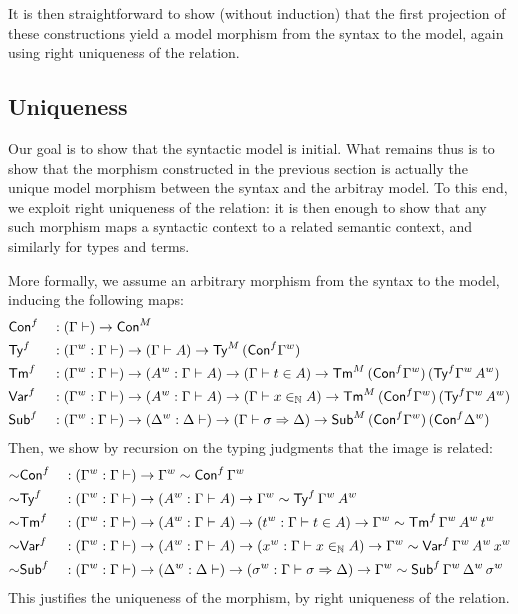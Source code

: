 It is then straightforward to show (without induction) that the first projection of these
constructions yield a model morphism from the syntax to the model, again using right
uniqueness of the relation.
\subsection{Uniqueness}
Our goal is to show that the syntactic model is initial. What remains thus is to
show that the morphism constructed in the previous section is actually the
unique model morphism between the syntax and the arbitray model.
To this end, we exploit right uniqueness of the relation: it is then enough to show
that any such morphism maps a syntactic context to a related semantic context,
and similarly for types and terms. 

More formally, we assume an arbitrary morphism from the
syntax to the model, inducing the following maps:
\begin{alignat*}{5}
  &
  {\mathsf{Con}}^f
  && :
   (\Gamma \vdash) \rightarrow {\mathsf{Con}}^M
   \\
  &
  {\mathsf{Ty}}^f
  && :
   ({\Gamma}^w:\Gamma \vdash) \rightarrow (\Gamma\vdash A)\rightarrow{\mathsf{Ty}}^M\,({\mathsf{Con}}^f{\Gamma}^w)
   \\
  &
  {\mathsf{Tm}}^f
  && :
  ({\Gamma}^w:\Gamma \vdash) \rightarrow ({A}^w:\Gamma\vdash A)\rightarrow
  (\Gamma\vdash t \in A)\rightarrow{\mathsf{Tm}}^M\,({\mathsf{Con}}^f{\Gamma}^w)\,
  ({\mathsf{Ty}}^f{\Gamma}^w\,{A}^w)
   \\
  &
  {\mathsf{Var}}^f
  && :
  ({\Gamma}^w:\Gamma \vdash) \rightarrow ({A}^w:\Gamma\vdash A)\rightarrow
  (\Gamma\vdash x \in_{\mathbb{N}} A)\rightarrow{\mathsf{Tm}}^M\,({\mathsf{Con}}^f{\Gamma}^w)\,
  ({\mathsf{Ty}}^f{\Gamma}^w\,{A}^w)
   \\
  &
  {\mathsf{Sub}}^f
  && :
  ({\Gamma}^w:\Gamma \vdash) \rightarrow
  ({\Delta}^w:\Delta \vdash) \rightarrow
  (\Gamma\vdash \sigma \Rightarrow \Delta)\rightarrow{\mathsf{Sub}}^M\,({\mathsf{Con}}^f{\Gamma}^w)\,
  ({\mathsf{Con}}^f{\Delta}^w)
\end{alignat*}
Then, we show by recursion on the typing judgments that
the image is related:
\begin{alignat*}{5}
  &
  {\sim}{\mathsf{Con}}^f
  && :
  ({\Gamma}^w : \Gamma \vdash) \rightarrow {\Gamma}^w\sim {\mathsf{Con}}^f\,{\Gamma}^w
  \\
  &
  {\sim}{\mathsf{Ty}}^f
  && :
  ({\Gamma}^w : \Gamma \vdash) \rightarrow
  ({A}^w : \Gamma \vdash A) \rightarrow
  {\Gamma}^w\sim {\mathsf{Ty}}^f\,{\Gamma}^w\,{A}^w
  \\
  &
  {\sim}{\mathsf{Tm}}^f
  && :
  ({\Gamma}^w : \Gamma \vdash) \rightarrow
  ({A}^w : \Gamma \vdash A) \rightarrow
  ({t}^w : \Gamma \vdash t \in A) \rightarrow
  {\Gamma}^w\sim {\mathsf{Tm}}^f\,{\Gamma}^w\,{A}^w\,{t}^w
  \\
  &
  {\sim}{\mathsf{Var}}^f
  && :
  ({\Gamma}^w : \Gamma \vdash) \rightarrow
  ({A}^w : \Gamma \vdash A) \rightarrow
  ({x}^w : \Gamma \vdash x \in_{\mathbb{N}} A) \rightarrow
  {\Gamma}^w\sim {\mathsf{Var}}^f\,{\Gamma}^w\,{A}^w\,{x}^w
  \\
  &
  {\sim}{\mathsf{Sub}}^f
  && :
  ({\Gamma}^w : \Gamma \vdash) \rightarrow
  ({\Delta}^w : \Delta \vdash) \rightarrow
  ({\sigma}^w : \Gamma \vdash \sigma \Rightarrow \Delta) \rightarrow
  {\Gamma}^w\sim {\mathsf{Sub}}^f\,{\Gamma}^w\,{\Delta}^w\,{\sigma}^w
\end{alignat*}
This justifies the uniqueness of the morphism, by right uniqueness of the relation.




